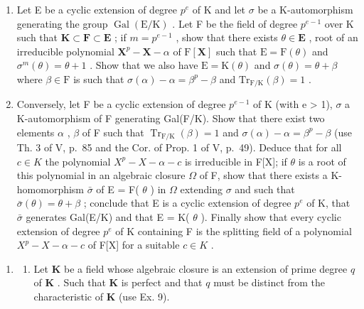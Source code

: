 \begin{enumerate}
\def\labelenumi{\alph{enumi})}
\item
  Let E be a cyclic extension of degree \(p^e\) of K and let \(\sigma\) be a K-automorphism generating the group \(\operatorname{Gal}(\mathrm{E} / \mathrm{K})\) . Let F be the field of degree \(p^{e - 1}\) over K such that \(\mathbf{K} \subset \mathbf{F} \subset \mathbf{E}\) ; if \(m = p^{e - 1}\) , show that there exists \(\theta \in \mathbf{E}\) , root of an irreducible polynomial \(\mathbf{X}^p - \mathbf{X} - \alpha\) of \(\mathrm{F}[\mathbf{X}]\) such that \(\mathrm{E} = \mathrm{F}(\theta)\) and \(\sigma^m (\theta) = \theta + 1\) . Show that we also have \(\mathrm{E} = \mathrm{K}(\theta)\) and \(\sigma (\theta) = \theta + \beta\) where \(\beta \in \mathrm{F}\) is such that \(\sigma (\alpha) - \alpha = \beta^p - \beta\) and \(\mathrm{Tr}_{\mathrm{F} / \mathrm{K}}(\beta) = 1\) .
\item
  Conversely, let F be a cyclic extension of degree \(p^{e-1}\) of K (with e \textgreater{} 1), \(\sigma\) a K-automorphism of F generating Gal(F/K). Show that there exist two elements \(\alpha\) , \(\beta\) of F such that \(\operatorname{Tr}_{\mathrm{F}/\mathrm{K}}(\beta) = 1\) and \(\sigma(\alpha) - \alpha = \beta^{p} - \beta\) (use Th. 3 of V, p.~85 and the Cor. of Prop. 1 of V, p.~49). Deduce that for all \(c \in K\) the polynomial \(X^{p} - X - \alpha - c\) is irreducible in F{[}X{]}; if \(\theta\) is a root of this polynomial in an algebraic closure \(\Omega\) of F, show that there exists a K-homomorphism \(\bar{\sigma}\) of E = F( \(\theta\) ) in \(\Omega\) extending \(\sigma\) and such that \(\bar{\sigma}(\theta) = \theta + \beta\) ; conclude that E is a cyclic extension of degree \(p^{e}\) of K, that \(\bar{\sigma}\) generates Gal(E/K) and that E = K( \(\theta\) ). Finally show that every cyclic extension of degree \(p^{e}\) of K containing F is the splitting field of a polynomial \(X^{p} - X - \alpha - c\) of F{[}X{]} for a suitable \(c \in K\) .
\end{enumerate}

\begin{enumerate}
\def\labelenumi{\arabic{enumi})}
\setcounter{enumi}{9}
\tightlist
\item
  \begin{enumerate}
  \def\labelenumii{\alph{enumii})}
  \tightlist
  \item
    Let \(\mathbf{K}\) be a field whose algebraic closure is an extension of prime degree \(q\) of \(\mathbf{K}\) . Such that \(\mathbf{K}\) is perfect and that \(q\) must be distinct from the characteristic of \(\mathbf{K}\) (use Ex. 9).
  \end{enumerate}
\end{enumerate}

